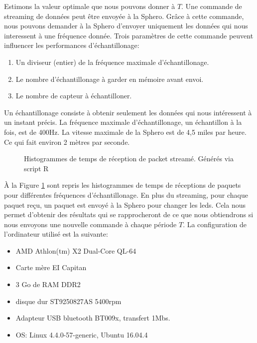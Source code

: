 Estimons la valeur optimale que nous pouvons donner à $T$.
Une commande de streaming de données peut être envoyée à la Sphero.
Grâce à cette commande, nous pouvons demander à la Sphero d'envoyer uniquement les données qui nous interessent à une fréquence donnée.
Trois paramètres de cette commande peuvent influencer les performances d'échantillonage:
\begin{enumerate}
 \item Un diviseur (entier) de la fréquence maximale d'échantillonage.
 \item Le nombre d'échantillonage à garder en mémoire avant envoi.
 \item Le nombre de capteur à échantilloner.
\end{enumerate}
Un échantillonage consiste à obtenir seulement les données qui nous intéressent à un instant précis.
La fréquence maximale d'échantillonage, un échantillon à la fois, est de 400Hz\cite{SDKofficiels}.
La vitesse maximale de la Sphero est de 4,5 miles par heure\cite{product}. Ce qui fait environ 2 mètres par seconde.
\begin{figure}
 \centering
 \caption{Histogrammes de temps de réception de packet streamé. Générés via script R}
 \label{histogrammes}
\end{figure}

À la Figure \ref{histogrammes} sont repris les histogrammes de temps de réceptions de paquets pour différentes fréquences d'échantillonage.
En plus du streaming, pour chaque paquet reçu, un paquet est envoyé à la Sphero pour changer les leds.
Cela nous permet d'obtenir des résultats qui se rapprocheront de ce que nous obtiendrons si nous envoyons une nouvelle commande à chaque période $T$.
La configuration de l'ordinateur utilisé est la suivante:
\begin{itemize}
 \item AMD Athlon(tm) X2 Dual-Core QL-64
 \item Carte mère EI Capitan
 \item 3 Go de RAM DDR2
 \item disque dur ST9250827AS 5400rpm
 \item Adapteur USB bluetooth BT009x, transfert 1Mbs.
 \item OS: Linux 4.4.0-57-generic, Ubuntu 16.04.4
\end{itemize}


